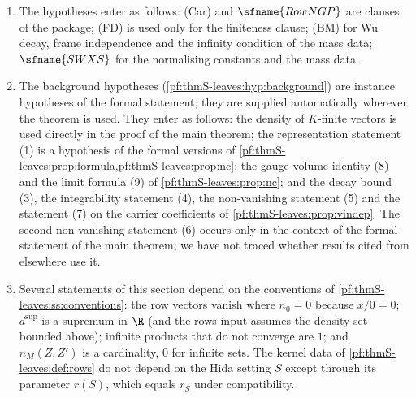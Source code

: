 \begin{remark}\label{pf:thmS-leaves:rem:formal}
\begin{enumerate}
\item The hypotheses enter as follows: (Car) and $\sfname{RowNGP}$ are clauses of the package; (FD) is used only for the finiteness
clause; (BM) for Wu decay, frame independence and the infinity condition of the mass data; $\sfname{SWXS}$ for the normalising
constants and the mass data.
\item The background hypotheses (\cref{pf:thmS-leaves:hyp:background}) are instance hypotheses of the formal statement; they are
supplied automatically wherever the theorem is used. They enter as follows: the density of $K$-finite vectors is used
directly in the proof of the main theorem; the representation statement (1) is a hypothesis of the formal versions of
\cref{pf:thmS-leaves:prop:formula,pf:thmS-leaves:prop:nc}; the gauge volume identity (8) and the limit formula (9) of
\cref{pf:thmS-leaves:prop:nc}; and the decay bound (3), the integrability statement (4), the non-vanishing statement (5) and
the statement (7) on the carrier coefficients of \cref{pf:thmS-leaves:prop:vindep}. The second non-vanishing statement (6)
occurs only in the context of the formal statement of the main theorem; we have not traced whether results cited from
elsewhere use it.
\item Several statements of this section depend on the conventions of \cref{pf:thmS-leaves:ss:conventions}: the row vectors vanish
where $n_0=0$ because $x/0=0$; $d^{\sup}$ is a supremum in $\R$ (and the rows input assumes the density set bounded above); infinite
products that do not converge are $1$; and $n_M(Z,Z')$ is a cardinality, $0$ for infinite sets. The kernel data of
\cref{pf:thmS-leaves:def:rows} do not depend on the Hida setting $S$ except through its parameter $r(S)$, which equals $r_S$ under
compatibility.
\end{enumerate}
\end{remark}
